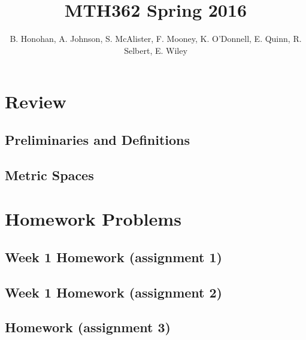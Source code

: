 \documentclass[12pt]{amsbook}
\theoremstyle{plain}
\numberwithin{section}{chapter}
\begin{document}
\title{MTH362 Spring 2016}
\maketitle
\author{B. Honohan, A. Johnson, S. McAlister, F. Mooney, K. O'Donnell, E. Quinn, R. Selbert, E. Wiley}
\setcounter{tocdepth}{4} 
\tableofcontents
\mainmatter 
\chapter{Review}
\section{Preliminaries and Definitions}


\section{Metric Spaces}


\chapter{Homework Problems}
\section{Week 1 Homework (assignment 1)}

\section{Week 1 Homework (assignment 2)}

\section{Homework (assignment 3)}

\end{document}
